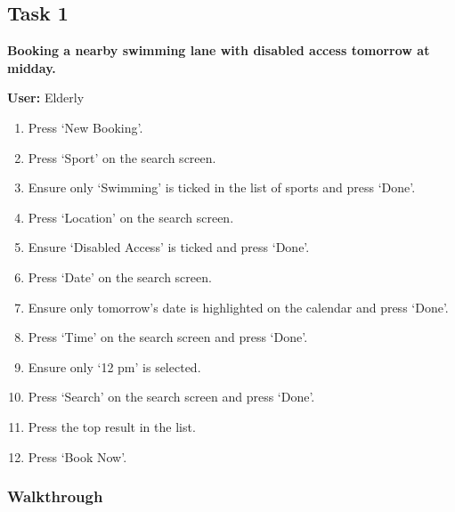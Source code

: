 \subsection{Task 1}
\label{ssub:task_1}

\textbf{Booking a nearby swimming lane with disabled access tomorrow at
midday.}

\textbf{User:} Elderly
\begin{enumerate}
	\item Press `New Booking'.
	\item Press `Sport' on the search screen.
	\item Ensure only `Swimming' is ticked in the list of sports and press
		`Done'.
	\item Press `Location' on the search screen.
	\item Ensure `Disabled Access' is ticked and press `Done'.
	\item Press `Date' on the search screen.
	\item Ensure only tomorrow's date is highlighted on the calendar and press
		`Done'.
	\item Press `Time' on the search screen and press `Done'.
	\item Ensure only `12 pm' is selected.
	\item Press `Search' on the search screen and press `Done'.
	\item Press the top result in the list.
	\item Press `Book Now'.
\end{enumerate}

\subsubsection{Walkthrough}

